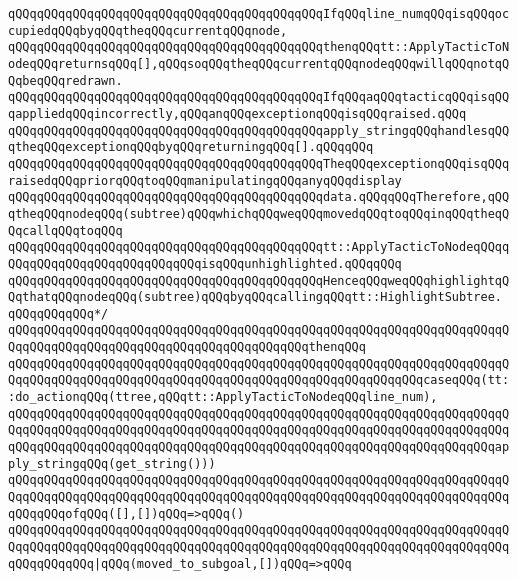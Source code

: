\verb|qQQqqQQqqQQqqQQqqQQqqQQqqQQqqQQqqQQqqQQqqQQqIfqQQqline_numqQQqisqQQqoccupiedqQQqbyqQQqtheqQQqcurrentqQQqnode,|\newline
\verb|qQQqqQQqqQQqqQQqqQQqqQQqqQQqqQQqqQQqqQQqqQQqthenqQQqtt::ApplyTacticToNodeqQQqreturnsqQQq[],qQQqsoqQQqtheqQQqcurrentqQQqnodeqQQqwillqQQqnotqQQqbeqQQqredrawn.|\newline
\verb|qQQqqQQqqQQqqQQqqQQqqQQqqQQqqQQqqQQqqQQqqQQqIfqQQqaqQQqtacticqQQqisqQQqappliedqQQqincorrectly,qQQqanqQQqexceptionqQQqisqQQqraised.qQQq|\newline
\verb|qQQqqQQqqQQqqQQqqQQqqQQqqQQqqQQqqQQqqQQqqQQqapply_stringqQQqhandlesqQQqtheqQQqexceptionqQQqbyqQQqreturningqQQq[].qQQqqQQq|\newline
\verb|qQQqqQQqqQQqqQQqqQQqqQQqqQQqqQQqqQQqqQQqqQQqTheqQQqexceptionqQQqisqQQqraisedqQQqpriorqQQqtoqQQqmanipulatingqQQqanyqQQqdisplay|\newline
\verb|qQQqqQQqqQQqqQQqqQQqqQQqqQQqqQQqqQQqqQQqqQQqdata.qQQqqQQqTherefore,qQQqtheqQQqnodeqQQq(subtree)qQQqwhichqQQqweqQQqmovedqQQqtoqQQqinqQQqtheqQQqcallqQQqtoqQQq|\newline
\verb|qQQqqQQqqQQqqQQqqQQqqQQqqQQqqQQqqQQqqQQqqQQqtt::ApplyTacticToNodeqQQqqQQqqQQqqQQqqQQqqQQqqQQqqQQqisqQQqunhighlighted.qQQqqQQq|\newline
\verb|qQQqqQQqqQQqqQQqqQQqqQQqqQQqqQQqqQQqqQQqqQQqHenceqQQqweqQQqhighlightqQQqthatqQQqnodeqQQq(subtree)qQQqbyqQQqcallingqQQqtt::HighlightSubtree.|\newline
\verb|qQQqqQQqqQQq*/|\newline
\verb|qQQqqQQqqQQqqQQqqQQqqQQqqQQqqQQqqQQqqQQqqQQqqQQqqQQqqQQqqQQqqQQqqQQqqQQqqQQqqQQqqQQqqQQqqQQqqQQqqQQqqQQqqQQqqQQqthenqQQq|\newline
\verb|qQQqqQQqqQQqqQQqqQQqqQQqqQQqqQQqqQQqqQQqqQQqqQQqqQQqqQQqqQQqqQQqqQQqqQQqqQQqqQQqqQQqqQQqqQQqqQQqqQQqqQQqqQQqqQQqqQQqqQQqqQQqqQQqcaseqQQq(tt::do_actionqQQq(ttree,qQQqtt::ApplyTacticToNodeqQQqline_num),|\newline
\verb|qQQqqQQqqQQqqQQqqQQqqQQqqQQqqQQqqQQqqQQqqQQqqQQqqQQqqQQqqQQqqQQqqQQqqQQqqQQqqQQqqQQqqQQqqQQqqQQqqQQqqQQqqQQqqQQqqQQqqQQqqQQqqQQqqQQqqQQqqQQqqQQqqQQqqQQqqQQqqQQqqQQqqQQqqQQqqQQqqQQqqQQqqQQqqQQqqQQqqQQqqQQqqQQqapply_stringqQQq(get_string()))|\newline
\verb|qQQqqQQqqQQqqQQqqQQqqQQqqQQqqQQqqQQqqQQqqQQqqQQqqQQqqQQqqQQqqQQqqQQqqQQqqQQqqQQqqQQqqQQqqQQqqQQqqQQqqQQqqQQqqQQqqQQqqQQqqQQqqQQqqQQqqQQqqQQqqQQqqQQqofqQQq([],[])qQQq=>qQQq()|\newline
\verb|qQQqqQQqqQQqqQQqqQQqqQQqqQQqqQQqqQQqqQQqqQQqqQQqqQQqqQQqqQQqqQQqqQQqqQQqqQQqqQQqqQQqqQQqqQQqqQQqqQQqqQQqqQQqqQQqqQQqqQQqqQQqqQQqqQQqqQQqqQQqqQQqqQQqqQQq|\verb#|qQQq(moved_to_subgoal,[])qQQq=>qQQq#\newline
